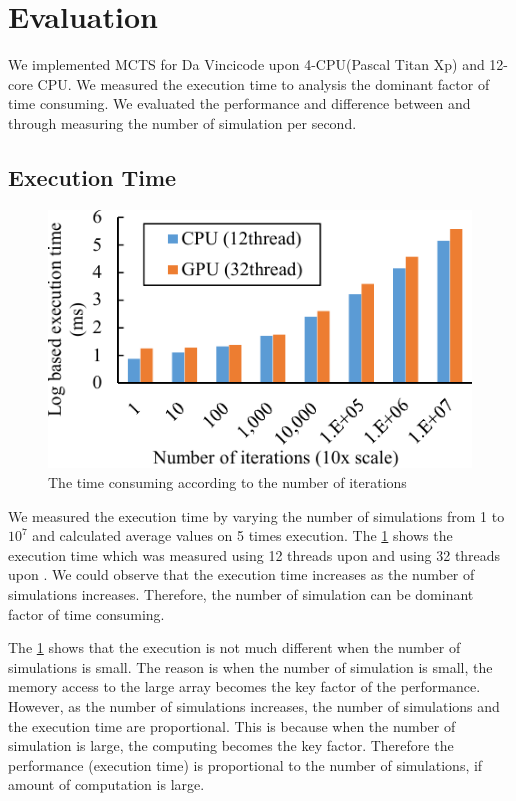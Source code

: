
\section{Evaluation}
We implemented MCTS for Da Vincicode upon 4-CPU(Pascal Titan Xp) and 12-core CPU.
We measured the execution time to analysis the dominant factor of time consuming.
We evaluated the performance and difference between \cpu and \gpu through measuring the number of simulation per second.

\subsection{Execution Time}
\begin{figure}
\includegraphics[width=0.95\columnwidth]{figures/time_consuming.pdf}
\caption{The time consuming according to the number of iterations}
\label{fig:time_consuming}
\end{figure}

We measured the execution time by varying the number of simulations from 1 to $10^7$ and calculated average values on 5 times execution. 
The \cref{fig:time_consuming} shows the execution time which was measured using 12 threads upon \cpu and using 32 threads upon \gpu.
We could observe that the execution time increases as the number of simulations increases.
Therefore, the number of simulation can be dominant factor of time consuming. 

The \cref{fig:time_consuming} shows that the execution is not much different when the number of simulations is small. 
The reason is when the number of simulation is small, the memory access to the large array becomes the key factor of the performance. 
However, as the number of simulations increases, the number of simulations and the execution time are proportional.
This is because when the number of simulation is large, the computing becomes the key factor. 
Therefore the performance (execution time) is proportional to the number of simulations, if amount of computation is large.

